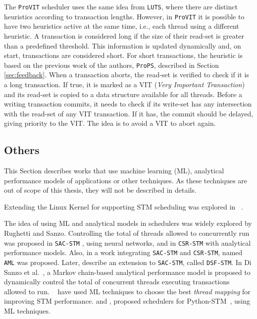 The \texttt{ProVIT} scheduler \cite{Rito:2015} uses the same idea from \texttt{LUTS}, where there are distinct heuristics according to transaction lengths. However, in \texttt{ProVIT} it is possible to have two heuristics active at the same time, i.e., each thread using a different heuristic. A transaction is considered long if the size of their read-set is greater than a predefined threshold. This information is updated dynamically and, on start, transactions are considered short. For short transactions, the heuristic is based on the previous work of the authors, \texttt{ProPS}, described in Section \ref{sec:feedback}. When a transaction aborts, the read-set is verified to check if it is a long transaction. If true, it is marked as a VIT (\emph{Very Important Transaction}) and its read-set is copied to a data structure available for all threads. Before a writing transaction commits, it needs to check if its write-set has any intersection with the read-set of any VIT transaction. If it has, the commit should be delayed, giving priority to the VIT. The idea is to avoid a VIT to abort again. 

\subsection{Others}\label{sec:otherSchedule}

This Section describes works that use machine learning (ML), analytical performance models of  applications or other techniques. As these techniques are out of scope of this thesis, they will not be described in details.

Extending the Linux Kernel for supporting STM scheduling was explored in ~\citeyearpar{Maldonado:2010,Maldonado:2011}.

The idea of using ML and analytical models in schedulers was widely explored by Rughetti and Sanzo. Controlling the total of threads allowed to concurrently run was proposed in \texttt{SAC-STM} \cite{Rughetti:2012}, using neural networks, and in \texttt{CSR-STM} \cite{Sanzo:2013} with analytical performance models. Also, in  a work integrating \texttt{SAC-STM} and \texttt{CSR-STM}, named \texttt{AML} was proposed. Later,  describe an extension to \texttt{SAC-STM}, called \texttt{DSF-STM}. In Di Sanzo et al.~\citeyearpar{Sanzo:2016,Sanzo:2020}, a Markov chain-based analytical performance model is proposed to dynamically control the total of concurrent threads executing transactions allowed to run. ~\citeyearpar{Castro:2011,Castro:2012} have used ML techniques to choose  the best \emph{thread mapping} for improving  STM performance.  and , proposed schedulers for Python-STM~\cite{PythonSTM}, using ML techniques.


